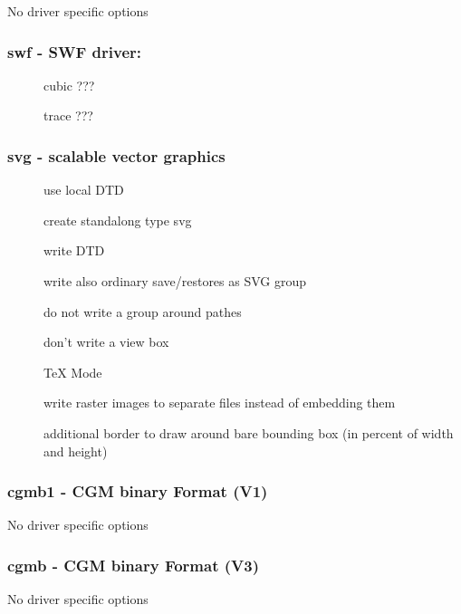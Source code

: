 \documentclass[english,a4paper]{article}
\begin{document}
No driver specific options
\subsubsection{swf - SWF driver: }
\begin{description}
\item[] 
cubic ???


\item[] 
trace ???


\end{description}
\subsubsection{svg - scalable vector graphics}
\begin{description}
\item[] 
use local DTD


\item[] 
create standalong type svg


\item[] 
write DTD


\item[] 
write also ordinary save/restores as SVG group


\item[] 
do not write a group around pathes


\item[] 
don't write a view box


\item[] 
TeX Mode


\item[] 
write raster images to separate files instead of embedding them


\item[] 
additional border to draw around bare bounding box (in percent of width and height)


\end{description}
\subsubsection{cgmb1 - CGM binary Format (V1)}
No driver specific options
\subsubsection{cgmb - CGM binary Format (V3)}
No driver specific options
\end{document}
